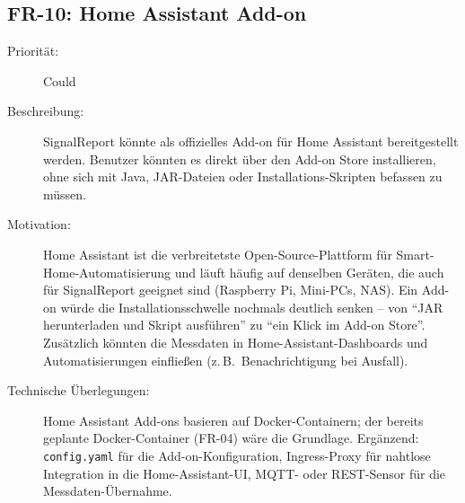 \subsection{FR-10: Home Assistant Add-on}
\begin{description}
  \item[Priorität:] Could
  \item[Beschreibung:] SignalReport könnte als offizielles Add-on für
    Home Assistant bereitgestellt werden. Benutzer könnten es direkt über den
    Add-on Store installieren, ohne sich mit Java, JAR-Dateien oder
    Installations-Skripten befassen zu müssen.
  \item[Motivation:] Home Assistant ist die verbreitetste Open-Source-Plattform
    für Smart-Home-Automatisierung und läuft häufig auf denselben Geräten, die
    auch für SignalReport geeignet sind (Raspberry Pi, Mini-PCs, NAS). Ein
    Add-on würde die Installationsschwelle nochmals deutlich senken -- von
    \enquote{JAR herunterladen und Skript ausführen} zu \enquote{ein Klick im
    Add-on Store}. Zusätzlich könnten die Messdaten in Home-Assistant-Dashboards
    und Automatisierungen einfließen (z.\,B.\ Benachrichtigung bei Ausfall).
  \item[Technische Überlegungen:] Home Assistant Add-ons basieren auf
    Docker-Containern; der bereits geplante Docker-Container (FR-04) wäre die
    Grundlage. Ergänzend: \texttt{config.yaml} für die Add-on-Konfiguration,
    Ingress-Proxy für nahtlose Integration in die Home-Assistant-UI,
    MQTT- oder REST-Sensor für die Messdaten-Übernahme.
\end{description}

